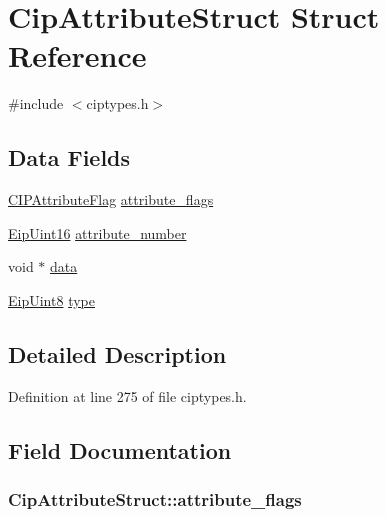 \hypertarget{structCipAttributeStruct}{\section{\-Cip\-Attribute\-Struct \-Struct \-Reference}
\label{d4/d62/structCipAttributeStruct}
}


{\ttfamily \#include $<$ciptypes.\-h$>$}

\subsection*{\-Data \-Fields}
\begin{DoxyCompactItemize}
\item 
\hyperlink{ciptypes_8h_a1e2feaa6e54b6217fe7d8ef02575d779}{\-C\-I\-P\-Attribute\-Flag} \hyperlink{structCipAttributeStruct_af7c732dc8c3751a06c58531542345eb1}{attribute\-\_\-flags}
\item 
\hyperlink{typedefs_8h_ac1b4cfa25b4f5def62f23b455dd395d8}{\-Eip\-Uint16} \hyperlink{structCipAttributeStruct_a8ef9e76a42d35217da662d4e583ecde7}{attribute\-\_\-number}
\item 
void $\ast$ \hyperlink{structCipAttributeStruct_a859d8bdd91ff42b1ce0ff5f8053d2b40}{data}
\item 
\hyperlink{typedefs_8h_aa0c108ee762a27720919a4634643040e}{\-Eip\-Uint8} \hyperlink{structCipAttributeStruct_a5882627a9fc1b118b1c34bf4da8a66cd}{type}
\end{DoxyCompactItemize}


\subsection{\-Detailed \-Description}


\-Definition at line 275 of file ciptypes.\-h.



\subsection{\-Field \-Documentation}
\hypertarget{structCipAttributeStruct_af7c732dc8c3751a06c58531542345eb1}{
\subsubsection[{attribute\-\_\-flags}]{ {\bf \-Cip\-Attribute\-Struct\-::attribute\-\_\-flags}}}\label{d4/d62/structCipAttributeStruct_af7c732dc8c3751a06c58531542345eb1}


